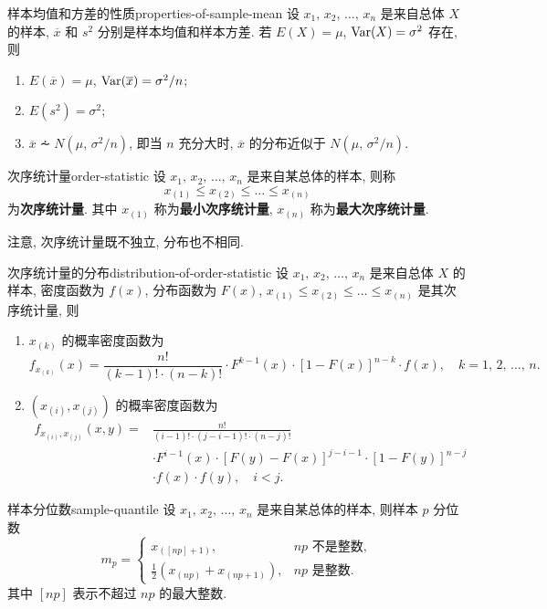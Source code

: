 \begin{newtheorembox}{样本均值和方差的性质}{properties-of-sample-mean}
	设 $x_1,\,x_2,\,\dots,\,x_n$ 是来自总体 $X$ 的样本, $\overline{x}$ 和 $s^2$ 分别是样本均值和样本方差.  若 $E(X)=\mu$, $\mathop{\mathrm{Var}}\nolimits(X)=\sigma^2$ 存在, 则
	\begin{enumerate}
		\item $E(\overline{x})=\mu$, $\mathop{\mathrm{Var}}\nolimits(\overline{x})=\sigma^2/n$;
		\item $E(s^2)=\sigma^2$;
		\item $\overline{x}\dotsim N(\mu,\,\sigma^2/n)$, 即当 $n$ 充分大时, $\overline{x}$ 的分布近似于 $N(\mu,\,\sigma^2/n)$.
	\end{enumerate}
\end{newtheorembox}

\begin{newdefbox}{次序统计量}{order-statistic}
	设 $x_1,\,x_2,\,\dots,\,x_n$ 是来自某总体的样本, 则称
	\[
		x_{(1)}\leqslant x_{(2)}\leqslant\dots\leqslant x_{(n)}
	\]
	为\textbf{次序统计量}.  其中 $x_{(1)}$ 称为\textbf{最小次序统计量}, $x_{(n)}$ 称为\textbf{最大次序统计量}.\par
	注意, 次序统计量既不独立, 分布也不相同.
\end{newdefbox}

\begin{newtheorembox}{次序统计量的分布}{distribution-of-order-statistic}
	设 $x_1,\,x_2,\,\dots,\,x_n$ 是来自总体 $X$ 的样本, 密度函数为 $f(x)$, 分布函数为 $F(x)$, $x_{(1)}\leqslant x_{(2)}\leqslant\dots\leqslant x_{(n)}$ 是其次序统计量, 则
	\begin{enumerate}
		\item $x_{(k)}$ 的概率密度函数为
			\[
				f_{x_{(k)}}(x)=\frac{n!}{(k-1)!\cdot(n-k)!}\cdot F^{k-1}(x)\cdot[1-F(x)]^{n-k}\cdot f(x),\quad k=1,\,2,\,\dots,\,n.
			\]
		\item $(x_{(i)},x_{(j)})$ 的概率密度函数为
			\[
				\begin{split}
					f_{x_{(i)},x_{(j)}}(x,y)={}&\frac{n!}{(i-1)!\cdot(j-i-1)!\cdot(n-j)!}\\&\cdot F^{i-1}(x)\cdot[F(y)-F(x)]^{j-i-1}\cdot[1-F(y)]^{n-j}\\&\cdot f(x)\cdot f(y),\quad i<j.
				\end{split}
			\]
	\end{enumerate}
\end{newtheorembox}

\begin{newdefbox}{样本分位数}{sample-quantile}
	设 $x_1,\,x_2,\,\dots,\,x_n$ 是来自某总体的样本, 则样本 $p$ 分位数
	\[
		m_p=\begin{cases}
			x_{([np]+1)}, & np\text{ 不是整数},\\
			\frac{1}{2}(x_{(np)}+x_{(np+1)}), & np\text{ 是整数}.
		\end{cases}
	\]
	其中 $[np]$ 表示不超过 $np$ 的最大整数.
\end{newdefbox}

